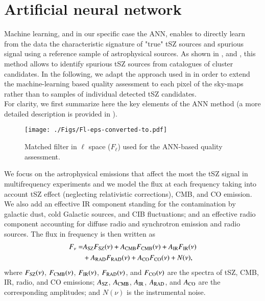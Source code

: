 \documentclass[traditabstract,a4,twocolumn]{aa}
\begin{document}
\section{Artificial neural network}

\label{ann_sec}
Machine learning, and in our specific case the ANN, enables to directly learn from the data the characteristic signature of "true" tSZ sources and spurious signal using a reference sample of astrophysical sources. As shown in \cite{agh14},\cite{van16} and \cite{planckPSZ,PSZ2}, this method allows to identify spurious tSZ sources from catalogues of cluster candidates.
In the following, we adapt the approach used in \cite{agh14} in order to extend the machine-learning based quality assessment to each pixel of the sky-maps rather than to samples of individual detected tSZ candidates.\\

For clarity, we first summarize here the key elements of the ANN method (a more detailed description is provided in \cite{agh14}).

\begin{figure}[!th]
\center
\texttt{[image: ./Figs/Fl-eps-converted-to.pdf]}
\caption{Matched filter in $\ell$ space ($F_\ell$) used for the ANN-based quality assessment.}
\label{fl}
\end{figure}

We focus on the astrophysical emissions that
affect the most the tSZ signal in multifrequency experiments and we model the flux at each frequency taking into account tSZ effect (neglecting relativistic
corrections), CMB, and CO emission. We also add an
effective IR component standing for the contamination by galactic dust, cold Galactic sources, and CIB fluctuations; and an
effective radio component accounting for diffuse radio and synchrotron
emission and radio sources. The flux in frequency is then written as
\begin{align}
F_\nu =& A_{\rm SZ} F_{\rm SZ}(\nu) + A_{\rm CMB} F_{\rm CMB}(\nu) +
A_{\rm IR} F_{\rm IR}(\nu) \nonumber \\
&+ A_{\rm RAD} F_{\rm RAD}(\nu) + A_{\rm CO}
F_{\rm CO}(\nu) + N(\nu),
\label{eq:model}
\end{align}
where $F_{\rm SZ}(\nu)$, $F_{\rm CMB}(\nu)$, $F_{\rm IR}(\nu)$,
$F_{\rm RAD}(\nu)$, and $F_{\rm CO}(\nu)$ are the spectra of tSZ, CMB,
IR, radio, and CO emissions; $A_{\rm SZ}$, $A_{\rm CMB}$, $A_{\rm
  IR}$, $A_{\rm RAD}$, and $A_{\rm CO}$ are the corresponding
amplitudes; and $N(\nu)$ is the instrumental noise.\\
\end{document}
